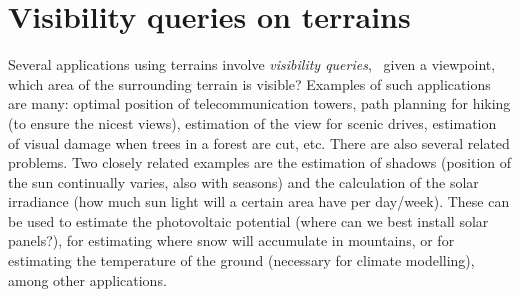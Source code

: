 
\graphicspath{{visibility/figs}}


\chapter{Visibility queries on terrains}%
\label{chap:visibility}


Several applications using terrains involve \emph{visibility queries}, \ie\ given a viewpoint, which area of the surrounding terrain is visible?
Examples of such applications are many: optimal position of telecommunication towers, path planning for hiking (to ensure the nicest views), estimation of the view for scenic drives, estimation of visual damage when trees in a forest are cut, etc.
There are also several related problems.
Two closely related examples are the estimation of shadows (position of the sun continually varies, also with seasons) and the calculation of the solar irradiance (how much sun light will a certain area have per day/week).
These can be used to estimate the photovoltaic potential (where can we best install solar panels?), for estimating where snow will accumulate in mountains, or for estimating the temperature of the ground (necessary for climate modelling), among other applications.

%

